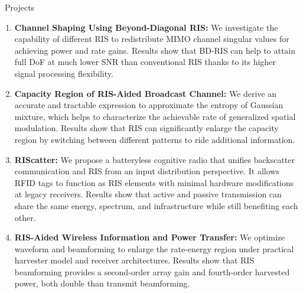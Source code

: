 \documentclass{cv}
\begin{document}
\begin{section}{\faPaperPlane\ Projects}
	\begin{enumerate}
		\item \textbf{Channel Shaping Using Beyond-Diagonal RIS:} We investigate the capability of different RIS to redistribute MIMO channel singular values for achieving power and rate gains. Results show that BD-RIS can help to attain full DoF at much lower SNR than conventional RIS thanks to its higher signal processing flexibility.
		\item \textbf{Capacity Region of RIS-Aided Broadcast Channel:} We derive an accurate and tractable expression to approximate the entropy of Gaussian mixture, which helps to characterize the achievable rate of generalized spatial modulation. Results show that RIS can significantly enlarge the capacity region by switching between different patterns to ride additional information.
		\item \textbf{RIScatter:} We propose a batteryless cognitive radio that unifies backscatter communication and RIS from an input distribution perspective. It allows RFID tags to function as RIS elements with minimal hardware modifications at legacy receivers. Results show that active and passive transmission can share the same energy, spectrum, and infrastructure while still benefiting each other.
		\item \textbf{RIS-Aided Wireless Information and Power Transfer:} We optimize waveform and beamforming to enlarge the rate-energy region under practical harvester model and receiver architectures. Results show that RIS beamforming provides a second-order array gain and fourth-order harvested power, both double than transmit beamforming.
	\end{enumerate}
\end{section}

\vspace{-1.5em}
\end{document}
